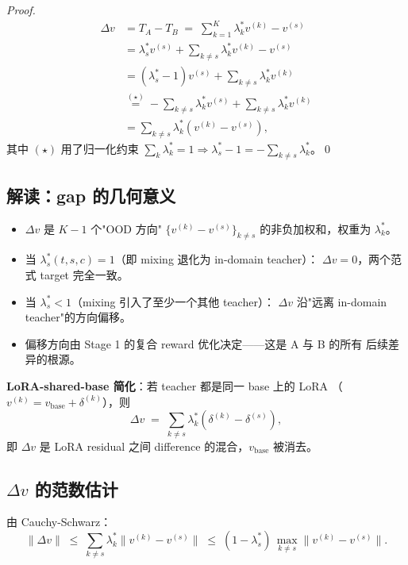 \documentclass[11pt,a4paper]{article}
\theoremstyle{definition}
\begin{document}
\begin{proof}
\begin{align}
\Delta v &= T_A - T_B \;=\; \sum_{k=1}^K \lambda_k^* v^{(k)} - v^{(s)} \\
&= \lambda_s^* v^{(s)} + \sum_{k \neq s} \lambda_k^* v^{(k)} - v^{(s)} \\
&= (\lambda_s^* - 1) v^{(s)} + \sum_{k \neq s} \lambda_k^* v^{(k)} \\
&\stackrel{(\star)}{=} -\sum_{k \neq s} \lambda_k^* v^{(s)} + \sum_{k \neq s} \lambda_k^* v^{(k)} \\
&= \sum_{k \neq s} \lambda_k^* (v^{(k)} - v^{(s)}),
\end{align}
其中 $(\star)$ 用了归一化约束 $\sum_k \lambda_k^* = 1 \Rightarrow
\lambda_s^* - 1 = -\sum_{k \neq s} \lambda_k^*$。\qed
\end{proof}

\subsection{解读：gap 的几何意义}

\begin{itemize}[leftmargin=1.5em]
\item $\Delta v$ 是 $K - 1$ 个"OOD 方向" $\{v^{(k)} - v^{(s)}\}_{k \neq s}$
的非负加权和，权重为 $\lambda_k^*$。
\item 当 $\lambda_s^*(t, s, c) = 1$（即 mixing 退化为 in-domain teacher）：
$\Delta v = 0$，两个范式 target 完全一致。
\item 当 $\lambda_s^* < 1$（mixing 引入了至少一个其他 teacher）：
$\Delta v$ 沿"远离 in-domain teacher"的方向偏移。
\item 偏移方向由 Stage 1 的复合 reward 优化决定——这是 A 与 B 的所有
后续差异的根源。
\end{itemize}

\textbf{LoRA-shared-base 简化}：若 teacher 都是同一 base 上的 LoRA
（$v^{(k)} = v_{\text{base}} + \delta^{(k)}$），则
\begin{equation}
\Delta v \;=\; \sum_{k \neq s} \lambda_k^* (\delta^{(k)} - \delta^{(s)}),
\label{eq:Delta_v_lora}
\end{equation}
即 $\Delta v$ 是 LoRA residual 之间 difference 的混合，$v_{\text{base}}$
被消去。

\subsection{$\Delta v$ 的范数估计}

由 Cauchy-Schwarz：
\begin{equation}
\|\Delta v\| \;\leq\; \sum_{k \neq s} \lambda_k^* \|v^{(k)} - v^{(s)}\|
\;\leq\; (1 - \lambda_s^*)\,\max_{k \neq s} \|v^{(k)} - v^{(s)}\|.
\end{equation}
\end{document}
